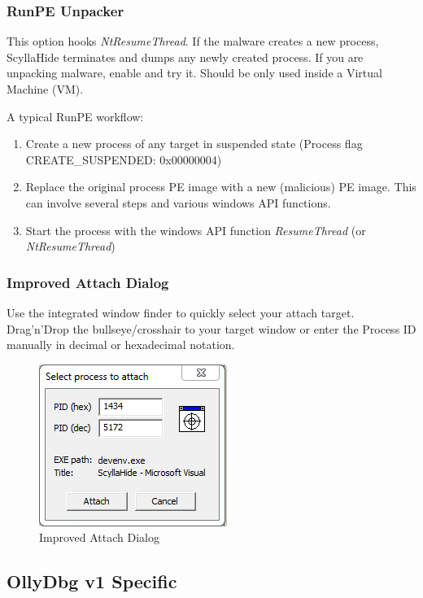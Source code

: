 \documentclass[10pt,a4paper]{article}
\begin{document}
\subsubsection{RunPE Unpacker}
This option hooks \textit{NtResumeThread}. If the malware creates a new process, ScyllaHide terminates and dumps any newly created process. If you are unpacking malware, enable and try it. Should be only used inside a Virtual Machine (VM).

A typical RunPE workflow:

\begin{enumerate}
\item Create a new process of any target in suspended state (Process flag CREATE\_SUSPENDED: 0x00000004)
\item Replace the original process PE image with a new (malicious) PE image. This can involve several steps and various windows API functions.
\item Start the process with the windows API function \textit{ResumeThread} (or \textit{NtResumeThread})
\end{enumerate}

\subsubsection{Improved Attach Dialog}
Use the integrated window finder to quickly select your attach target. Drag'n'Drop the bullseye/crosshair to your target window or enter the Process ID manually in decimal or hexadecimal notation.
\begin{figure}[H]
\centering
\includegraphics[scale=0.8]{newattachdialog.PNG}
\caption{Improved Attach Dialog}
\end{figure}

\subsection{OllyDbg v1 Specific}
\end{document}
